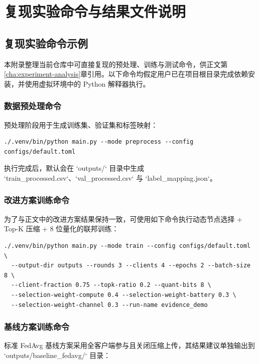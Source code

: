 \chapter{复现实验命令与结果文件说明}
\label{app:repro-materials}

\section{复现实验命令示例}
\label{app:repro-commands}

本附录整理当前仓库中可直接复现的预处理、训练与测试命令，供正文第\ref{cha:experiment-analysis}章引用。以下命令均假定用户已在项目根目录完成依赖安装，并使用虚拟环境中的 Python 解释器执行。

\subsection{数据预处理命令}

预处理阶段用于生成训练集、验证集和标签映射：

\begin{verbatim}
./.venv/bin/python main.py --mode preprocess --config configs/default.toml
\end{verbatim}

执行完成后，默认会在 `outputs/` 目录中生成 `train\_processed.csv`、`val\_processed.csv` 与 `label\_mapping.json`。

\subsection{改进方案训练命令}

为了与正文中的改进方案结果保持一致，可使用如下命令执行动态节点选择 + Top-K 压缩 + 8 位量化的联邦训练：

\begin{verbatim}
./.venv/bin/python main.py --mode train --config configs/default.toml \
  --output-dir outputs --rounds 3 --clients 4 --epochs 2 --batch-size 8 \
  --client-fraction 0.75 --topk-ratio 0.2 --quant-bits 8 \
  --selection-weight-compute 0.4 --selection-weight-battery 0.3 \
  --selection-weight-channel 0.3 --run-name evidence_demo
\end{verbatim}

\subsection{基线方案训练命令}

标准 FedAvg 基线方案采用全客户端参与且关闭压缩上传，其结果建议单独输出到 `outputs/baseline\_fedavg/` 目录：

